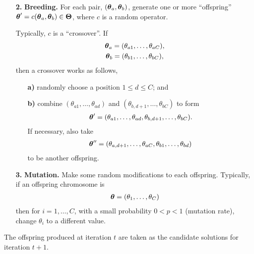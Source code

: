 \begin{frame}
  \begin{enumerate}
  \item[\bf 2.] \textbf{Breeding.}  For each pair, $(\boldsymbol{\theta}_a,
    \boldsymbol{\theta}_b)$, generate one or more ``offspring'' $\boldsymbol{\theta}' =
    c(\boldsymbol{\theta}_a, \boldsymbol{\theta}_b)\in\boldsymbol{\Theta}$, where $c$ is a random
    operator.

    Typically, $c$ is a ``crossover''.  If
    \begin{gather*}
      \boldsymbol{\theta}_a =  (\theta_{a1}, \ldots, \theta_{a C}), \\
      \boldsymbol{\theta}_b = (\theta_{b1}, \ldots, \theta_{b C}),
    \end{gather*}
    then a crossover works as follows,
    \begin{enumerate}
    \item[\bf a)] randomly choose a position $1\le d\le C$; and
    \item[\bf b)] combine $(\theta_{a1}, \ldots, \theta_{ad})$ and
      $(\theta_{b,d+1}, \ldots, \theta_{b C})$ to form
      \begin{align*}
        \boldsymbol{\theta}'=(\theta_{a1}, \ldots, \theta_{ad},
        \theta_{b,d+1}, \ldots, \theta_{b C}).
      \end{align*}
      If necessary, also take
      \begin{align*}
        \boldsymbol{\theta}''=
        (\theta_{a,d+1}, \ldots, \theta_{a C},
        \theta_{b1}, \ldots, \theta_{b d})
      \end{align*}
      to be another offspring.
    \end{enumerate}
  \end{enumerate}
\end{frame}


\begin{frame}
  \begin{enumerate}
  \item[\bf 3.] \textbf{Mutation.}  Make some random modifications to
    each offspring.  Typically, if an offspring chromosome is
    \begin{align*}
      \boldsymbol{\theta}=({\theta}_1, \ldots, {\theta}_{C})
    \end{align*}
    then for $i=1,\ldots,C$, with a small probability $0<p<1$
    (mutation rate), change $\theta_i$ to a different value.
  \end{enumerate}

  The offspring produced at iteration $t$ are taken as the candidate
  solutions for iteration $t+1$.

\end{frame}


